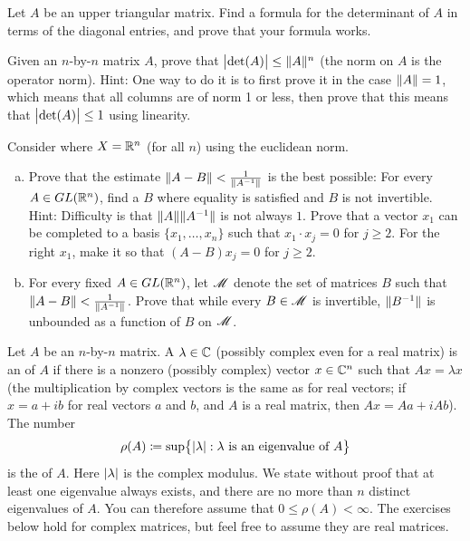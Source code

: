 \begin{exercise}
Let $A$ be an upper triangular matrix.  Find a formula for the determinant
of $A$ in terms of the diagonal entries, and prove that your formula works.
\end{exercise}

\begin{exercise}
Given an $n$-by-$n$ matrix $A$, prove that
$\bigl\lvert {\det(A)} \bigr\rvert \leq \lVert {A} \rVert^n$ (the norm on $A$ is the operator norm).
Hint: One way to do it is to first prove it in the case $\lVert {A} \rVert=1$, which
means that all columns are of norm 1 or less, then prove that this means
that $\bigl\lvert {\det(A)} \bigr\rvert \leq 1$ using linearity.
\end{exercise}

\begin{exercise}
Consider 
where $X={\mathbb{R}}^n$ (for all $n$) using the euclidean norm.
\begin{enumerate}[a)]
\item
Prove that the estimate $\lVert {A-B} \rVert < \frac{1}{\lVert {A^{-1}} \rVert}$ is the
best possible:
For every 
$A \in GL({\mathbb{R}}^n)$,
find a $B$ where equality is satisfied and $B$ is not invertible.
Hint:
Difficulty is that $\lVert {A} \rVert\lVert {A^{-1}} \rVert$ is not always $1$.
Prove that a vector $x_1$ can be completed to a basis
$\{ x_1,\ldots,x_n \}$ such that $x_1 \cdot x_j = 0$ for $j \geq 2$.
For the right $x_1$,
make it so that $(A-B)x_j = 0$ for $j \geq 2$.
\item
For every fixed $A \in GL({\mathbb{R}}^n)$,
let ${\mathscr{M}}$ denote the set of matrices
$B$ such that
$\lVert {A-B} \rVert < \frac{1}{\lVert {A^{-1}} \rVert}$.
Prove that while every $B \in {\mathscr{M}}$ is 
invertible, $\lVert {B^{-1}} \rVert$ is unbounded
as a function of $B$ on ${\mathscr{M}}$.
\end{enumerate}
\end{exercise}

\begin{exnote}
Let $A$ be an $n$-by-$n$ matrix.
A $\lambda \in {\mathbb{C}}$ (possibly complex even for a real matrix)
is an \emph{} of $A$
if there is a nonzero (possibly complex) vector $x \in {\mathbb{C}}^n$ such that
$Ax = \lambda x$
(the multiplication by complex vectors is the same as for real vectors;
if $x = a+ib$ for real vectors $a$ and $b$, and $A$ is a real matrix, then $Ax = Aa + i Ab$).
The number
\begin{equation*}
\rho(A) \coloneqq
\sup \bigl\{ \lvert {\lambda} \rvert : \lambda \text{ is an eigenvalue of } A \bigr\}
\end{equation*}
is the \emph{} of $A$.  Here $\lvert {\lambda} \rvert$ is the complex
modulus.  We state without proof that at least one eigenvalue always exists,
and there are no more than $n$ distinct eigenvalues of $A$.  You can
therefore assume that $0 \leq \rho(A) < \infty$.
The exercises below hold for complex matrices, but feel free to assume they
are real matrices.
\end{exnote}

